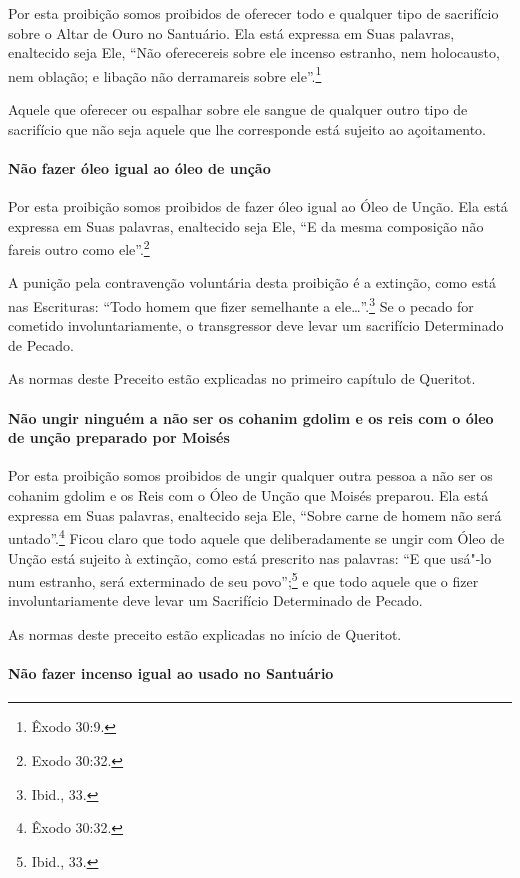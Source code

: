 \begin{multicols}{2}
Por esta proibição somos proibidos de oferecer todo e qualquer tipo de
sacrifício sobre o Altar de Ouro no Santuário. Ela está expressa em Suas
palavras, enaltecido seja Ele, ``Não oferecereis sobre ele incenso
estranho, nem holocausto, nem oblação; e libação não derramareis sobre
ele''.\footnote{Êxodo 30:9.}

Aquele que oferecer ou espalhar sobre ele sangue de qualquer outro tipo
de sacrifício que não seja aquele que lhe corresponde está sujeito ao
açoitamento.

\paragraph{Não fazer óleo igual ao óleo de unção}

Por esta proibição somos proibidos de fazer óleo igual ao Óleo de Unção.
Ela está expressa em Suas palavras, enaltecido seja Ele, ``E da mesma
composição não fareis outro como ele''.\footnote{Exodo 30:32.}

A punição pela contravenção voluntária desta proibição é a extinção,
como está nas Escrituras: ``Todo homem que fizer semelhante a ele\ldots{}''.\footnote{Ibid., 33.} Se o pecado for cometido involuntariamente, o transgressor
deve levar um sacrifício Determinado de Pecado.

As normas deste Preceito estão explicadas no primeiro capítulo de Queritot\starr.

\paragraph{Não ungir ninguém a não ser os cohanim gdolim\starr{} e os reis com o óleo de
unção preparado por Moisés}

Por esta proibição somos proibidos de ungir qualquer outra pessoa a não
ser os cohanim gdolim\starr{} e os Reis com o Óleo de Unção que Moisés
preparou. Ela está expressa em Suas palavras, enaltecido seja Ele,
``Sobre carne de homem não será untado''.\footnote{Êxodo 30:32.} Ficou claro que
todo aquele que deliberadamente se ungir com Óleo de Unção está sujeito
à extinção, como está prescrito nas palavras: ``E que usá"-lo num
estranho, será exterminado de seu povo'';\footnote{Ibid., 33.} e que todo aquele
que o fizer involuntariamente deve levar um Sacrifício Determinado de
Pecado.

As normas deste preceito estão explicadas no início de Queritot\starr.

\paragraph{Não fazer incenso igual ao usado no Santuário}


\end{multicols}
